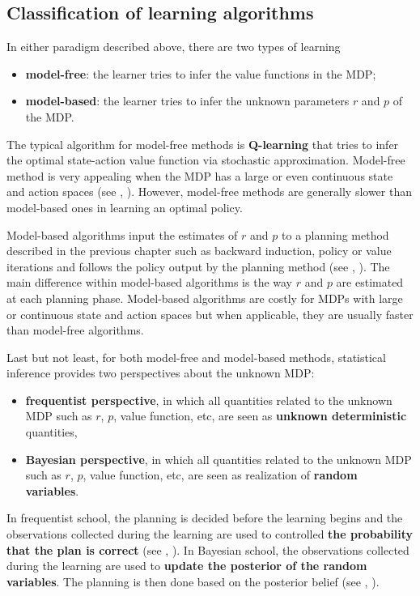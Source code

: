 \subsection{Classification of learning algorithms}
\label{ch:rl:ssec:class_algo}

In either paradigm described above, there are two types of learning
\begin{itemize}
    \item \textbf{model-free}: the learner tries to infer the value functions in the MDP;
    \item \textbf{model-based}: the learner tries to infer the unknown parameters $r$ and $p$ of the MDP.
\end{itemize}
The typical algorithm for model-free methods is \textbf{Q-learning} \cite{watkins1989learning} that tries to infer the optimal state-action value function via stochastic approximation. 
Model-free method is very appealing when the MDP has a large or even continuous state and action spaces (see \eg, \cite{mnih2015human, bellemare2017distributional, dabney2018distributional}).
However, model-free methods are generally slower than model-based ones in learning an optimal policy.

Model-based algorithms input the estimates of $r$ and $p$ to a planning method described in the previous chapter such as backward induction, policy or value iterations and follows the policy output by the planning method (see \eg, \cite{jaksch2010near, osband2013more, azar2017minimax}).
The main difference within model-based algorithms is the way $r$ and $p$ are estimated at each planning phase.
Model-based algorithms are costly for MDPs with large or continuous state and action spaces but when applicable, they are usually faster than model-free algorithms.

Last but not least, for both model-free and model-based methods, statistical inference provides two perspectives about the unknown MDP:
\begin{itemize}
    \item \textbf{frequentist perspective}, in which all quantities related to the unknown MDP such as $r$, $p$, value function, etc, are seen as \textbf{unknown deterministic} quantities,
    \item \textbf{Bayesian perspective}, in which all quantities related to the unknown MDP such as $r$, $p$, value function, etc, are seen as realization of \textbf{random variables}.
\end{itemize}
In frequentist school, the planning is decided before the learning begins and the observations collected during the learning are used to controlled \textbf{the probability that the plan is correct} (see \eg, \cite{jaksch2010near, azar2017minimax, jin2018q, shi2022pessimistic}).
In Bayesian school, the observations collected during the learning are used to \textbf{update the posterior of the random variables}.
The planning is then done based on the posterior belief (see \eg, \cite{osband2013more, ouyang2017learning, bellemare2017distributional, dabney2018distributional}).

